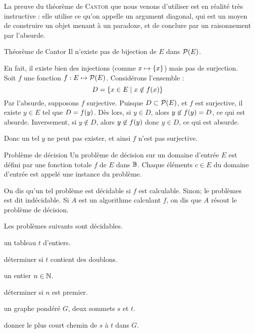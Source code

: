 \documentclass[a4paper,french,bookmarks]{book}
\begin{document}
    La preuve du théorème de \textsc{Cantor} que nous venons d'utiliser est en réalité très instructive : elle utilise ce qu'on appelle un argument diagonal, qui est un moyen de construire un objet menant à un paradoxe, et de conclure par un raisonnement par l'absurde.
    
    \begin{theorem}{Théorème de Cantor}
        Il n'existe pas de bijection de $E$ dans $\mathcal{P}(E)$.
    \end{theorem}
    
    \begin{nproof}
        En fait, il existe bien des injections (comme $x \mapsto \left\{x\right\}$) mais pas de surjection. Soit $f$ une fonction $f : E \mapsto \mathcal{P}\!\left(E\right)$. Considérons l'ensemble :
        \[ D = \left\{x \in E \;\middle\vert\; x \not\in f\!\left(x\right)\right\}\]
         Par l'absurde, supposons $f$ surjective. Puisque $D \subset \mathcal{P}\!\left(E\right)$, et $f$ est surjective, il existe $y \in E$ tel que $D = f\!\left(y\right)$. Dès lors, si $y \in D$, alors $y \not\in f\!\left(y\right) = D$, ce qui est absurde. Inversement, si $y \not\in D$, alors $y \not\in f\!\left(y\right)$ donc $y \in D$, ce qui est absurde.
         
         Donc un tel $y$ ne peut pas exister, et ainsi $f$ n'est pas surjective.
    \end{nproof}
    
    
    \begin{definition}{Problème de décision}{}
        Un problème de décision sur un domaine d'entrée $E$ est défini par une fonction totale $f$ de $E$ dans $\mathbb{B}$. Chaque éléments $c\in E$ du domaine d'entrée est appelé une instance du problème.
        
        On dis qu'un tel problème est décidable si $f$ est calculable. Sinon; le problèmes est dit indécidable. Si $A$ est un algorithme calculant $f$, on dis que $A$ résout le problème de décision.
    \end{definition}
    
    \begin{example}
        Les problèmes suivants sont décidables.
        \begin{enumerate}
            \itt{} un tableau $t$ d'entiers.
            
                 déterminer si $t$ contient des doublons.
                
            \itt{} un entier $n \in \mathbb{N}$.
            
                 déterminer si $n$ est premier.
                
            \itt{} un graphe pondéré $G$, deux sommets $s$ et $t$.
            
                 donner le plus court chemin de $s$ à $t$ dans $G$.
        \end{enumerate}
    \end{example}
    
    
\end{document}
